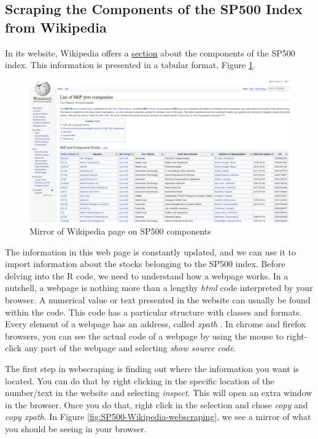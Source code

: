 \documentclass[11pt,]{book}
\begin{document}
\subsection{Scraping the Components of the SP500 Index from
Wikipedia}\label{scraping-the-components-of-the-sp500-index-from-wikipedia}

In its website, Wikipedia offers a
\href{https://en.wikipedia.org/wiki/List_of_S\%26P_500_companies}{section}
about the components of the SP500 index. This information is presented
in a tabular format, Figure \ref{fig:SP500-wikipedia}.

\begin{figure}[!htbp]

{\centering \includegraphics[width=0.75\linewidth]{figs/SP500-Wikipedia} 

}

\caption{Mirror of Wikipedia page on SP500 components}\label{fig:SP500-wikipedia}
\end{figure}

The information in this web page is constantly updated, and we can use
it to import information about the stocks belonging to the SP500 index.
Before delving into the R code, we need to understand how a webpage
works. In a nutshell, a webpage is nothing more than a lengthy
\emph{html} code interpreted by your browser. A numerical value or text
presented in the website can usually be found within the code. This code
has a particular structure with classes and formats. Every element of a
webpage has an address, called \emph{xpath} . In chrome and firefox
browsers, you can see the actual code of a webpage by using the mouse to
right-click any part of the webpage and selecting \emph{show source
code}.

The first step in webscraping is finding out where the information you
want is located. You can do that by right clicking in the specific
location of the number/text in the website and selecting \emph{inspect}.
This will open an extra window in the browser. Once you do that, right
click in the selection and chose \emph{copy} and \emph{copy xpath}. In
Figure \ref{fig:SP500-Wikipedia-webscraping}, we see a mirror of what
you should be seeing in your browser.
\end{document}
